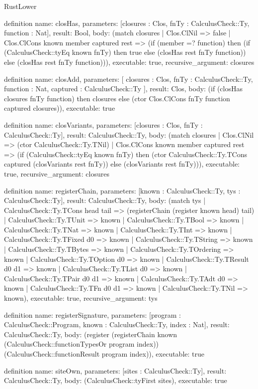 \begin{lexlean}{RustLower}
\begin{semanticmodule}
definition{
  name: closHas,
  parameters: [closures : Clos, fnTy : CalculusCheck::Ty, function : Nat],
  result: Bool,
  body: (match closures
    | Clos.ClNil => false
    | Clos.ClCons known member captured rest => (if (member =? function) then (if (CalculusCheck::tyEq known fnTy) then true else (closHas rest fnTy function)) else (closHas rest fnTy function))),
  executable: true,
  recursive_argument: closures
}

definition{
  name: closAdd,
  parameters: [
    closures : Clos,
    fnTy : CalculusCheck::Ty,
    function : Nat,
    captured : CalculusCheck::Ty
  ],
  result: Clos,
  body: (if (closHas closures fnTy function) then closures else (ctor Clos.ClCons fnTy function captured closures)),
  executable: true
}

definition{
  name: closVariants,
  parameters: [closures : Clos, fnTy : CalculusCheck::Ty],
  result: CalculusCheck::Ty,
  body: (match closures
    | Clos.ClNil => (ctor CalculusCheck::Ty.TNil)
    | Clos.ClCons known member captured rest => (if (CalculusCheck::tyEq known fnTy) then (ctor CalculusCheck::Ty.TCons captured (closVariants rest fnTy)) else (closVariants rest fnTy))),
  executable: true,
  recursive_argument: closures
}

definition{
  name: registerChain,
  parameters: [known : CalculusCheck::Ty, tys : CalculusCheck::Ty],
  result: CalculusCheck::Ty,
  body: (match tys
    | CalculusCheck::Ty.TCons head tail => (registerChain (register known head) tail)
    | CalculusCheck::Ty.TUnit => known
    | CalculusCheck::Ty.TBool => known
    | CalculusCheck::Ty.TNat => known
    | CalculusCheck::Ty.TInt => known
    | CalculusCheck::Ty.TFixed d0 => known
    | CalculusCheck::Ty.TString => known
    | CalculusCheck::Ty.TBytes => known
    | CalculusCheck::Ty.TOrdering => known
    | CalculusCheck::Ty.TOption d0 => known
    | CalculusCheck::Ty.TResult d0 d1 => known
    | CalculusCheck::Ty.TList d0 => known
    | CalculusCheck::Ty.TPair d0 d1 => known
    | CalculusCheck::Ty.TAdt d0 => known
    | CalculusCheck::Ty.TFn d0 d1 => known
    | CalculusCheck::Ty.TNil => known),
  executable: true,
  recursive_argument: tys
}

definition{
  name: registerSignature,
  parameters: [program : CalculusCheck::Program, known : CalculusCheck::Ty, index : Nat],
  result: CalculusCheck::Ty,
  body: (register (registerChain known (CalculusCheck::functionTypesOr program index)) (CalculusCheck::functionResult program index)),
  executable: true
}

definition{
  name: siteOwn,
  parameters: [sites : CalculusCheck::Ty],
  result: CalculusCheck::Ty,
  body: (CalculusCheck::tyFirst sites),
  executable: true
}


\end{semanticmodule}
\end{lexlean}
